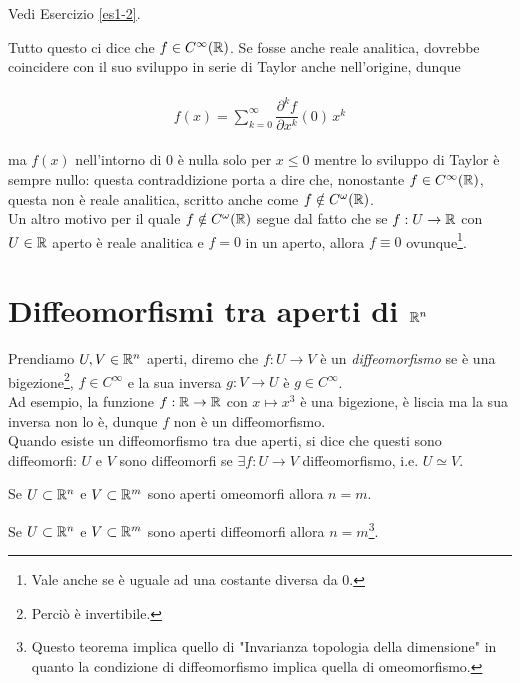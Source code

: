 Vedi Esercizio \ref{es1-2}.

Tutto questo ci dice che $ f \in C^{\infty}(\mathbb{R}) $. Se fosse anche reale analitica, dovrebbe coincidere con il suo sviluppo in serie di Taylor anche nell'origine, dunque

\begin{align}
	\begin{split}
		f(x) = \sum_{k=0}^{\infty} \dfrac{\partial^{k} f}{\partial x^{k}} (0) \, x^{k}
	\end{split}
\end{align}

ma $ f(x) $ nell'intorno di 0 è nulla solo per $ x \leqslant 0 $ mentre lo sviluppo di Taylor è sempre nullo: questa contraddizione porta a dire che, nonostante $ f \in C^{\infty}(\mathbb{R}) $, questa non è reale analitica, scritto anche come $ f \notin C^{\omega}(\mathbb{R}) $.\\
Un altro motivo per il quale $ f \notin C^{\omega}(\mathbb{R}) $ segue dal fatto che se $ f : U \to \mathbb{R} $ con $ U \in \mathbb{R} $ aperto è reale analitica e $ f = 0 $ in un aperto, allora $ f \equiv 0 $ ovunque\footnote{%
	Vale anche se è uguale ad una costante diversa da 0.}.

\section{Diffeomorfismi tra aperti di $ \mathbb{R}^{n} $}

Prendiamo $ U, V \in \mathbb{R}^{n} $ aperti, diremo che $ f : U \to V $ è un \textit{diffeomorfismo} se è una bigezione\footnote{%
	Perciò è invertibile.%
}, $ f \in C^{\infty} $ e la sua inversa $ g : V \to U $ è  $ g \in C^{\infty} $.\\
Ad esempio, la funzione $ f : \mathbb{R} \to \mathbb{R} $ con $ x \mapsto x^{3} $ è una bigezione, è liscia ma la sua inversa non lo è, dunque $ f $ non è un diffeomorfismo.\\
Quando esiste un diffeomorfismo tra due aperti, si dice che questi sono diffeomorfi: $ U $ e $ V $ sono diffeomorfi se $ \exists f : U \to V $ diffeomorfismo, i.e. $ U \simeq V $.\\

\begin{theorem}
	Se $ U \subset \mathbb{R}^{n} $ e $ V \subset \mathbb{R}^{m} $ sono aperti omeomorfi allora $ n = m $.
\end{theorem}

\begin{theorem}
	Se $ U \subset \mathbb{R}^{n} $ e $ V \subset \mathbb{R}^{m} $ sono aperti diffeomorfi allora $ n = m $\footnote{%
		Questo teorema implica quello di "Invarianza topologia della dimensione" in quanto la condizione di diffeomorfismo implica quella di omeomorfismo.}.
\end{theorem}


